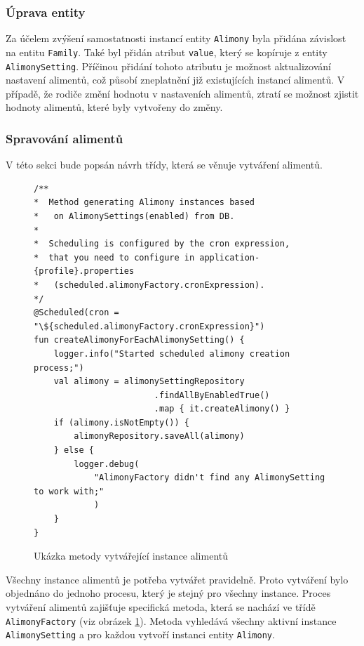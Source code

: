         \subsubsection{Úprava entity}
            Za účelem zvýšení samostatnosti instancí entity \verb|Alimony| byla přidána závislost na entitu \verb|Family|. Také byl přidán atribut \verb|value|, který se kopíruje z entity \verb|AlimonySetting|. Příčinou přidání tohoto atributu je možnost aktualizování nastavení alimentů, což působí zneplatnění již existujících instancí alimentů. V případě, že rodiče změní hodnotu v nastaveních alimentů, ztratí se možnost zjistit hodnoty alimentů, které byly vytvořeny do změny.
            
        \subsubsection{Spravování alimentů} 
            V této sekci bude popsán návrh třídy, která se věnuje vytváření alimentů.
        
            \begin{figure}
                \begin{verbatim}
/**
*  Method generating Alimony instances based 
*   on AlimonySettings(enabled) from DB.
*
*  Scheduling is configured by the cron expression,
*  that you need to configure in application-{profile}.properties 
*   (scheduled.alimonyFactory.cronExpression).
*/
@Scheduled(cron = "\${scheduled.alimonyFactory.cronExpression}")
fun createAlimonyForEachAlimonySetting() {
    logger.info("Started scheduled alimony creation process;")
    val alimony = alimonySettingRepository
                        .findAllByEnabledTrue()
                        .map { it.createAlimony() }
    if (alimony.isNotEmpty()) {
        alimonyRepository.saveAll(alimony)
    } else {
        logger.debug(
            "AlimonyFactory didn't find any AlimonySetting to work with;"
            )
    }
}
                \end{verbatim}
                \caption{Ukázka metody vytvářející instance alimentů} 
                \label{code:create-alimony}
            \end{figure}
            Všechny instance alimentů je potřeba vytvářet pravidelně. Proto vytváření bylo objednáno do jednoho procesu, který je stejný pro všechny instance. Proces vytváření alimentů zajišťuje specifická metoda, která se nachází ve třídě \verb|AlimonyFactory| (viz obrázek \ref{code:create-alimony}). Metoda vyhledává všechny aktivní instance \verb|AlimonySetting| a pro každou vytvoří instanci entity \verb|Alimony|. 
            
